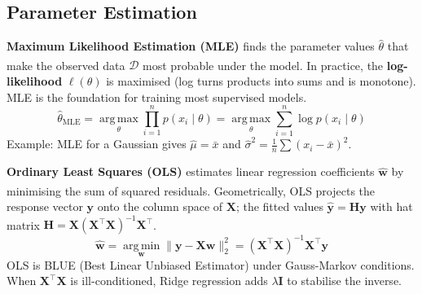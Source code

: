     \subsection{Parameter Estimation}
    \begin{tcbitemize}[ skin=sectionraster ]

        \tcbitem[title={Maximum Likelihood Estimation}, raster multicolumn=6]
        \textbf{Maximum Likelihood Estimation (MLE)} finds the parameter values $\hat{\theta}$ that make the observed data $\mathcal{D}$ most probable under the model\textsuperscript{\cite{hastieElementsStatisticalLearning2008}}. In practice, the \textbf{log-likelihood} $\ell(\theta)$ is maximised (log turns products into sums and is monotone). MLE is the foundation for training most supervised models.
        \tcblower
        \begin{equation}
            \hat{\theta}_{\mathrm{MLE}} = \operatorname*{arg\,max}_\theta \prod_{i=1}^n p(x_i \mid \theta)
            = \operatorname*{arg\,max}_\theta \sum_{i=1}^n \log p(x_i \mid \theta)
        \end{equation}
        Example: MLE for a Gaussian gives $\hat{\mu} = \bar{x}$ and $\hat{\sigma}^2 = \frac{1}{n}\sum(x_i - \bar{x})^2$.

        \tcbitem[title={Ordinary Least Squares}, raster multicolumn=6]
        \textbf{Ordinary Least Squares (OLS)} estimates linear regression coefficients $\hat{\mathbf{w}}$ by minimising the sum of squared residuals\textsuperscript{\cite{jamesIntroductionStatisticalLearning2013}}. Geometrically, OLS projects the response vector $\mathbf{y}$ onto the column space of $\mathbf{X}$; the fitted values $\hat{\mathbf{y}} = \mathbf{H}\mathbf{y}$ with hat matrix $\mathbf{H} = \mathbf{X}(\mathbf{X}^\top\mathbf{X})^{-1}\mathbf{X}^\top$.
        \tcblower
        \begin{equation}
            \hat{\mathbf{w}} = \operatorname*{arg\,min}_{\mathbf{w}} \|\mathbf{y} - \mathbf{X}\mathbf{w}\|^2_2
            = (\mathbf{X}^\top\mathbf{X})^{-1}\mathbf{X}^\top\mathbf{y}
        \end{equation}
        OLS is BLUE (Best Linear Unbiased Estimator) under Gauss-Markov conditions. When $\mathbf{X}^\top\mathbf{X}$ is ill-conditioned, Ridge regression adds $\lambda\mathbf{I}$ to stabilise the inverse.

    \end{tcbitemize}

